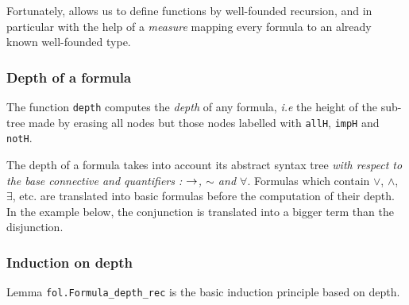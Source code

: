 

Fortunately, \coq allows us to define functions by well-founded recursion, and in particular with the help of a \emph{measure} mapping every formula to an already known well-founded type.





\subsubsection{Depth of a formula}

The function \texttt{depth} computes the \emph{depth} of  any formula, \emph{i.e} the height of the sub-tree made
by erasing all nodes but those nodes labelled with
\texttt{allH}, \texttt{impH} and \texttt{notH}.



\begin{remark}
  The depth of a formula takes into account its abstract syntax tree \emph{with respect to the base connective and quantifiers : $\mbox{$\rightarrow$}$, $\sim$ and $\forall$}.
    Formulas which contain $\vee$, $\wedge$, $\exists$, etc. are translated into
    basic formulas before the computation of their depth. In the example below, 
the conjunction is translated into a bigger term than the disjunction.


\end{remark}

\subsubsection{Induction on depth}

Lemma \texttt{fol.Formula\_depth\_rec} is the basic
induction principle based on depth.


